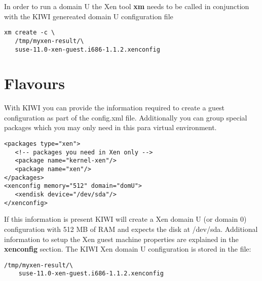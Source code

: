 In order to run a domain U the Xen tool \textbf{xm} needs to be called
in conjunction with the KIWI genereated domain U configuration file

\begin{Command}{13cm}
\begin{verbatim}
xm create -c \
   /tmp/myxen-result/\
   suse-11.0-xen-guest.i686-1.1.2.xenconfig
\end{verbatim}
\end{Command}

\section{Flavours}

With KIWI you can provide the information
required to create a guest configuration as part of the config.xml
file. Additionally you can group special packages which you may only
need in this para virtual environment.

\begin{Command}{13cm}
\begin{verbatim}
<packages type="xen">
   <!-- packages you need in Xen only -->
   <package name="kernel-xen"/>
   <package name="xen"/>
</packages>
<xenconfig memory="512" domain="domU">
   <xendisk device="/dev/sda"/>
</xenconfig>
\end{verbatim}
\end{Command}

If this information is present KIWI will create a Xen domain U
(or domain 0)
configuration with 512 MB of RAM and expects the disk at /dev/sda.
Additional information to setup the Xen guest machine properties are
explained in the \textbf{xenconfig} section. The KIWI Xen domain U
configuration is stored in the file:

\begin{Command}{13cm}
\begin{verbatim}
/tmp/myxen-result/\
    suse-11.0-xen-guest.i686-1.1.2.xenconfig
\end{verbatim}
\end{Command}

